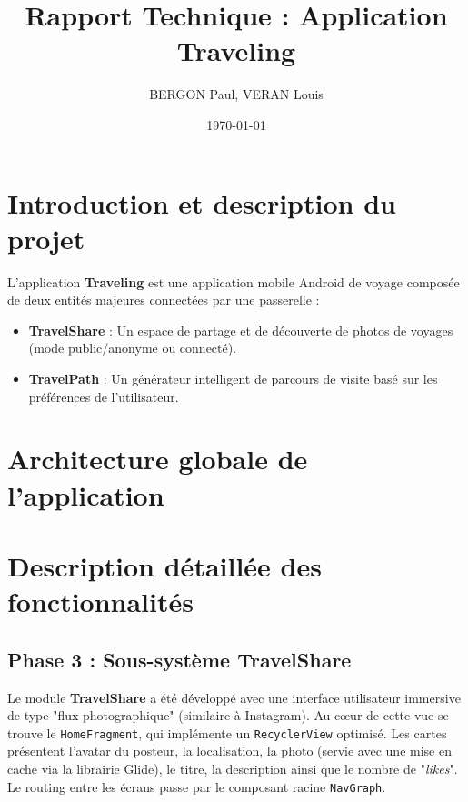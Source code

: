 \documentclass{article}
\title{Rapport Technique : Application Traveling}
\author{BERGON Paul, VERAN Louis}
\date{\today}
\begin{document}
\maketitle
\tableofcontents
\newpage

\section{Introduction et description du projet}
L'application \textbf{Traveling} est une application mobile Android de voyage composée de deux entités majeures connectées par une passerelle :
\begin{itemize}
    \item \textbf{TravelShare} : Un espace de partage et de découverte de photos de voyages (mode public/anonyme ou connecté).
    \item \textbf{TravelPath} : Un générateur intelligent de parcours de visite basé sur les préférences de l'utilisateur.
\end{itemize}

\section{Architecture globale de l'application}


\section{Description détaillée des fonctionnalités}

\subsection{Phase 3 : Sous-système TravelShare}
Le module \textbf{TravelShare} a été développé avec une interface utilisateur immersive de type "flux photographique" (similaire à Instagram). Au cœur de cette vue se trouve le \texttt{HomeFragment}, qui implémente un \texttt{RecyclerView} optimisé.
Les cartes présentent l'avatar du posteur, la localisation, la photo (servie avec une mise en cache via la librairie Glide), le titre, la description ainsi que le nombre de "\textit{likes}". Le routing entre les écrans passe par le composant racine \texttt{NavGraph}.
\end{document}
